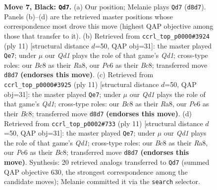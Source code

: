 \documentclass[11pt]{article}
\begin{document}
\begin{figure}[p]
\caption{\textbf{Move 7, Black: \texttt{Qd7}.} (a) Our position; Melanie plays \texttt{Qd7} (\texttt{d8d7}). Panels (b)--(d) are the retrieved master positions whose correspondence most drove this move (highest QAP objective among those that transfer to it). (b) Retrieved from \texttt{ccrl\_top\_p0000\#3924} (ply 11) [structural distance $d$=50, QAP obj=31]: the master played \texttt{Qe7}; under $\mu$ our \emph{Qd1} plays the role of that game's \emph{Qd1}; cross-type roles: our \emph{B}c8 as their \emph{R}a8, our \emph{P}e6 as their \emph{B}c8; transferred move \texttt{d8d7} \textbf{(endorses this move)}. (c) Retrieved from \texttt{ccrl\_top\_p0000\#3925} (ply 11) [structural distance $d$=50, QAP obj=31]: the master played \texttt{Qe7}; under $\mu$ our \emph{Qd1} plays the role of that game's \emph{Qd1}; cross-type roles: our \emph{B}c8 as their \emph{R}a8, our \emph{P}e6 as their \emph{B}c8; transferred move \texttt{d8d7} \textbf{(endorses this move)}. (d) Retrieved from \texttt{ccrl\_top\_p0002\#733} (ply 11) [structural distance $d$=50, QAP obj=31]: the master played \texttt{Qe7}; under $\mu$ our \emph{Qd1} plays the role of that game's \emph{Qd1}; cross-type roles: our \emph{B}c8 as their \emph{R}a8, our \emph{P}e6 as their \emph{B}c8; transferred move \texttt{d8d7} \textbf{(endorses this move)}. Synthesis: 20 retrieved analogs transferred to \texttt{Qd7} (summed QAP objective 630, the strongest correspondence among the candidate moves); Melanie committed it via the \texttt{search} selector.}
\label{fig:thought-m13}
\end{figure}

\clearpage
\end{document}
